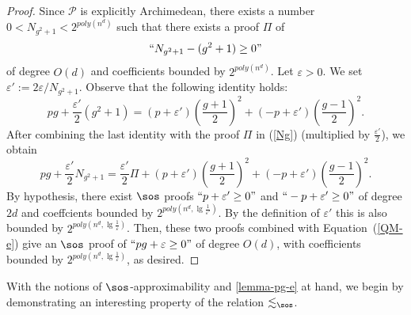 \documentclass[11pt]{article}
\begin{document}
\begin{proof}
Since $\mathcal{P}$ is explicitly Archimedean, there exists a number $0 < N_{g^2+1} < 2^{poly(n^d)}$ such that there exists a proof $\Pi$ of
\begin{align}\label{Ng}
    ``N_{g^2+1} - (g^2+1) \geq 0"
\end{align}
of degree $O(d)$ and coefficients bounded by $2^{poly(n^d)}$. Let $\varepsilon>0$. We set $\varepsilon':= 2\varepsilon/N_{g^2+1}$.  Observe that the following identity holds:
    \begin{equation}\label{identity-fg}
        p g + \frac{\varepsilon'}{2}(g^2 + 1) = (p+\varepsilon')\left( \frac{g+1}{2} \right)^2 + (- p+\varepsilon' )\left( \frac{g-1}{2} \right)^2.
    \end{equation}
After combining the last identity with the proof $\Pi$ in (\ref{Ng}) (multiplied by $\frac{\varepsilon'}{2}$), we obtain  
    \begin{equation}\label{QM-e}
        pg + \frac{\varepsilon'}{2}N_{g^2+1} = \frac{\varepsilon'}{2}\Pi + (p+\varepsilon' )\left( \frac{g+1}{2} \right)^2 + (-p+\varepsilon')\left( \frac{g-1}{2} \right)^2.
    \end{equation}
 By hypothesis, there exist $\sos$ proofs  $``p + \varepsilon' \geq 0"$ and  
      $``-p + \varepsilon' \geq 0"$ of degree $2d$ and coeffcients bounded by $2^{poly(n^d,\lg\frac{1}{\varepsilon'})}$. By the definition of $\varepsilon'$ this is also bounded by $2^{poly(n^d,\lg\frac{1}{\varepsilon})}$. Then, these two proofs combined with Equation~(\ref{QM-e}) give an $\sos$ proof of $``pg+\varepsilon\geq 0"$ of degree $O(d)$, with coefficients bounded by $2^{poly(n^d, \lg\frac{1}{\varepsilon})}$, as desired.
\end{proof}

With the notions of $\sos$-approximability and \cref{lemma-pg-e} at hand, we begin by demonstrating an interesting property of the relation $\lesssim_{\sos}$.
\end{document}
